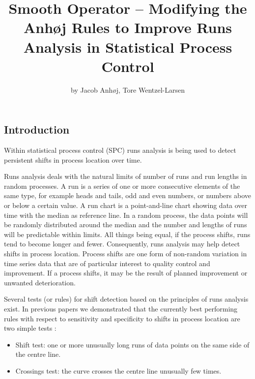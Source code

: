 \title{Smooth Operator -- Modifying the Anhøj Rules to Improve Runs Analysis in
Statistical Process Control}
\author{by Jacob Anhøj, Tore Wentzel-Larsen}

\maketitle



\hypertarget{introduction}{%
\subsection{Introduction}\label{introduction}}

Within statistical process control (SPC) runs analysis is being used to
detect persistent shifts in process location over time.

Runs analysis deals with the natural limits of number of runs and run
lengths in random processes. A run is a series of one or more
consecutive elements of the same type, for example heads and tails, odd
and even numbers, or numbers above or below a certain value. A run chart
is a point-and-line chart showing data over time with the median as
reference line. In a random process, the data points will be randomly
distributed around the median and the number and lengths of runs will be
predictable within limits. All things being equal, if the process
shifts, runs tend to become longer and fewer. Consequently, runs
analysis may help detect shifts in process location. Process shifts are
one form of non-random variation in time series data that are of
particular interest to quality control and improvement. If a process
shifts, it may be the result of planned improvement or unwanted
deterioration.

Several tests (or rules) for shift detection based on the principles of
runs analysis exist. In previous papers we demonstrated that the
currently best performing rules with respect to sensitivity and
specificity to shifts in process location are two simple tests
\citep{anhoej2014, anhoej2015, anhoej2018}:

\begin{itemize}
\tightlist
\item
  Shift test: one or more unusually long runs of data points on the same
  side of the centre line.
\item
  Crossings test: the curve crosses the centre line unusually few times.
\end{itemize}

